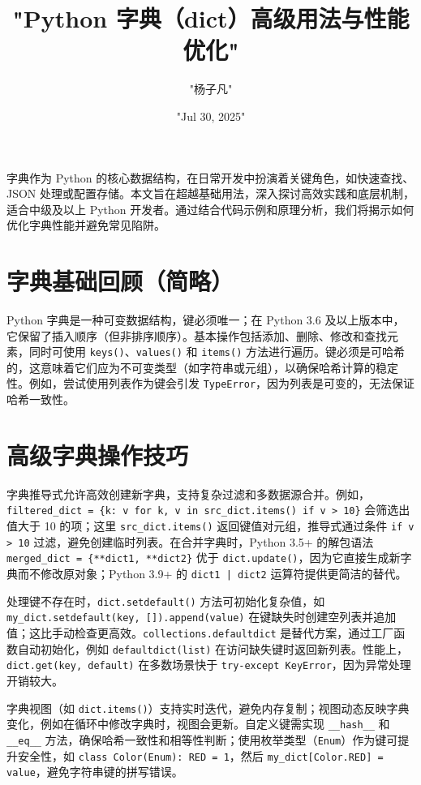 \title{"Python 字典（dict）高级用法与性能优化"}
\author{"杨子凡"}
\date{"Jul 30, 2025"}
\maketitle
字典作为 Python 的核心数据结构，在日常开发中扮演着关键角色，如快速查找、JSON 处理或配置存储。本文旨在超越基础用法，深入探讨高效实践和底层机制，适合中级及以上 Python 开发者。通过结合代码示例和原理分析，我们将揭示如何优化字典性能并避免常见陷阱。\par
\chapter{字典基础回顾（简略）}
Python 字典是一种可变数据结构，键必须唯一；在 Python 3.6 及以上版本中，它保留了插入顺序（但非排序顺序）。基本操作包括添加、删除、修改和查找元素，同时可使用 \texttt{keys()}、\texttt{values()} 和 \texttt{items()} 方法进行遍历。键必须是可哈希的，这意味着它们应为不可变类型（如字符串或元组），以确保哈希计算的稳定性。例如，尝试使用列表作为键会引发 \texttt{TypeError}，因为列表是可变的，无法保证哈希一致性。\par
\chapter{高级字典操作技巧}
字典推导式允许高效创建新字典，支持复杂过滤和多数据源合并。例如，\texttt{filtered\_{}dict = \{{}k: v for k, v in src\_{}dict.items() if v > 10\}{}} 会筛选出值大于 10 的项；这里 \texttt{src\_{}dict.items()} 返回键值对元组，推导式通过条件 \texttt{if v > 10} 过滤，避免创建临时列表。在合并字典时，Python 3.5+ 的解包语法 \texttt{merged\_{}dict = \{{}**dict1, **dict2\}{}} 优于 \texttt{dict.update()}，因为它直接生成新字典而不修改原对象；Python 3.9+ 的 \texttt{dict1 | dict2} 运算符提供更简洁的替代。\par
处理键不存在时，\texttt{dict.setdefault()} 方法可初始化复杂值，如 \texttt{my\_{}dict.setdefault(key, []).append(value)} 在键缺失时创建空列表并追加值；这比手动检查更高效。\texttt{collections.defaultdict} 是替代方案，通过工厂函数自动初始化，例如 \texttt{defaultdict(list)} 在访问缺失键时返回新列表。性能上，\texttt{dict.get(key, default)} 在多数场景快于 \texttt{try-except KeyError}，因为异常处理开销较大。\par
字典视图（如 \texttt{dict.items()}）支持实时迭代，避免内存复制；视图动态反映字典变化，例如在循环中修改字典时，视图会更新。自定义键需实现 \texttt{\_{}\_{}hash\_{}\_{}} 和 \texttt{\_{}\_{}eq\_{}\_{}} 方法，确保哈希一致性和相等性判断；使用枚举类型（\texttt{Enum}）作为键可提升安全性，如 \texttt{class Color(Enum): RED = 1}，然后 \texttt{my\_{}dict[Color.RED] = value}，避免字符串键的拼写错误。\par
